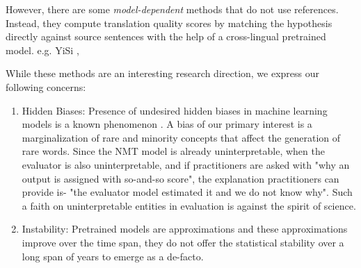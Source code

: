 \begin{enumerate}
    However, there are some \textit{model-dependent} methods that do not use references. Instead, they compute translation quality scores by matching the hypothesis directly against source sentences with the help of a cross-lingual pretrained model. e.g. YiSi \cite{lo-2019-yisi},
    
    While these methods are an interesting research direction, we express our following concerns: 
    
\begin{enumerate}
    \item Hidden Biases: Presence of undesired hidden biases in machine learning models is a known phenomenon . 
    A bias of our primary interest is a marginalization of rare and minority concepts that affect the generation of rare words\cite{gowda2020finding}. 
    Since the NMT model is already uninterpretable, when the evaluator is also uninterpretable, and if practitioners are asked with "why an output is assigned with so-and-so score", the explanation practitioners can provide is- "the evaluator model estimated it and we do not know why". 
    Such a faith on uninterpretable entities in evaluation is against the spirit of science.
    
    \item Instability: Pretrained models are approximations and these approximations improve over the time span, they do not offer the statistical stability over a long span of years to emerge as a de-facto. 
    
\end{enumerate}

\end{enumerate}

